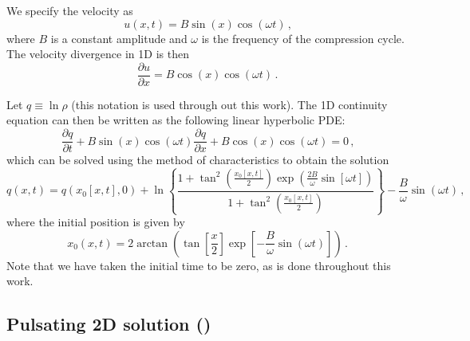 \documentclass[11pt]{book}
\begin{document}
We specify the velocity as
\begin{equation}
\label{eqn_velocity1d}
u(x,t)  = B \sin(x) \cos(\omega t) \,\mbox{,}
\end{equation}
where $B$ is a constant amplitude and $\omega$ is the frequency of the compression cycle. The velocity divergence in 1D is then
\begin{equation}
\label{eqn_pdesource1d}
\frac{\partial u}{\partial x} = B \cos(x) \cos(\omega t) \,\mbox{.}
\end{equation}

Let $q \equiv \ln \rho$ (this notation is used through out this work).  The 1D continuity equation can then be written as the following linear hyperbolic PDE:
\begin{equation}
\label{eqn_cont1d}
\frac{\partial q}{\partial t} + B \sin(x) \cos(\omega t) \frac{\partial q}{\partial x} + B \cos(x) \cos(\omega t) = 0 \,\mbox{,}
\end{equation}
which can be solved using the method of characteristics to obtain the solution
\begin{equation}
\label{eqn_1dsoln}
q(x,t) = q(x_0[x,t],0) + \ln \left\{ \frac{ 1 + \tan^2\left(\frac{x_0[x,t]}{2}\right) \exp\left(\frac{2B}{\omega}\sin[\omega t]\right) }{ 1 + \tan^2\left(\frac{x_0[x,t]}{2}\right) } \right\} - \frac{B}{\omega} \sin(\omega t) \,\mbox{,}
\end{equation}
where the initial position is given by
\begin{equation}
\label{eqn_initialposition1d}
x_0(x,t) = 2 \arctan\left( \tan\left[\frac{x}{2}\right] \exp\left[-\frac{B}{\omega}\sin(\omega t)\right] \right) \,\mbox{.}
\end{equation}
Note that we have taken the initial time to be zero, as is done throughout this work.


\subsection{Pulsating 2D solution (\texorpdfstring{}{pulsating})}
\label{soln_2d}
\end{document}
